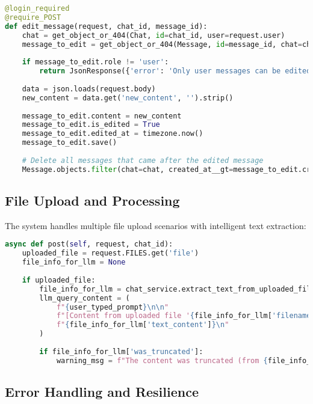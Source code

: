 \documentclass[12pt,a4paper]{article}
\begin{document}
\begin{lstlisting}[language=Python, caption=Message Editing Implementation]
@login_required
@require_POST
def edit_message(request, chat_id, message_id):
    chat = get_object_or_404(Chat, id=chat_id, user=request.user)
    message_to_edit = get_object_or_404(Message, id=message_id, chat=chat)
    
    if message_to_edit.role != 'user':
        return JsonResponse({'error': 'Only user messages can be edited.'}, status=403)
    
    data = json.loads(request.body)
    new_content = data.get('new_content', '').strip()
    
    message_to_edit.content = new_content
    message_to_edit.is_edited = True
    message_to_edit.edited_at = timezone.now()
    message_to_edit.save()
    
    # Delete all messages that came after the edited message
    Message.objects.filter(chat=chat, created_at__gt=message_to_edit.created_at).delete()
\end{lstlisting}

\subsection{File Upload and Processing}

The system handles multiple file upload scenarios with intelligent text extraction:

\begin{lstlisting}[language=Python, caption=File Processing Logic]
async def post(self, request, chat_id):
    uploaded_file = request.FILES.get('file')
    file_info_for_llm = None
    
    if uploaded_file:
        file_info_for_llm = chat_service.extract_text_from_uploaded_file(uploaded_file)
        llm_query_content = (
            f"{user_typed_prompt}\n\n"
            f"[Content from uploaded file '{file_info_for_llm['filename']}':]\n"
            f"{file_info_for_llm['text_content']}\n"
        )
        
        if file_info_for_llm['was_truncated']:
            warning_msg = f"The content was truncated (from {file_info_for_llm['original_char_count']} to {file_info_for_llm['final_char_count']} characters)"
\end{lstlisting}

\subsection{Error Handling and Resilience}
\end{document}
